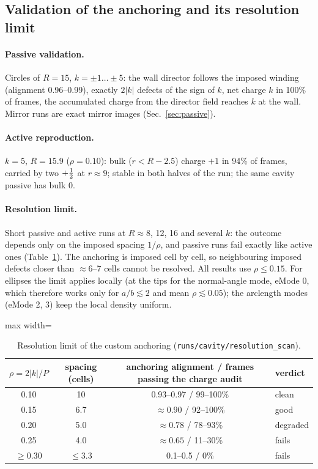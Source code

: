 
\subsection{Validation of the anchoring and its resolution limit}\label{sec:resolution}
\paragraph{Passive validation.} Circles of $R=15$, $k=\pm1\dots\pm5$: the wall director follows the imposed winding
(alignment 0.96--0.99), exactly $2|k|$ defects of the sign of $k$, net charge $k$ in 100\% of frames, the accumulated charge
from the director field reaches $k$ at the wall. Mirror runs are exact mirror images (Sec.~\ref{sec:passive}).
\paragraph{Active reproduction.} $k=5$, $R=15.9$ ($\rho=0.10$): bulk ($r<R-2.5$) charge $+1$ in 94\% of frames, carried by two
$+\tfrac12$ at $r\approx9$; stable in both halves of the run; the same cavity passive has bulk 0.
\paragraph{Resolution limit.} \SIcand Short passive and active runs at $R\approx8$, 12, 16 and several $k$: the outcome depends only on the
imposed spacing $1/\rho$, and passive runs fail exactly like active ones (Table~\ref{tab:res}). The anchoring is imposed
cell by cell, so neighbouring imposed defects closer than $\approx6$--7 cells cannot be resolved. All results use
$\rho\le0.15$. For ellipses the limit applies locally (at the tips for the normal-angle mode, eMode 0, which therefore works
only for $a/b\lesssim2$ and mean $\rho\lesssim0.05$); the arclength modes (eMode 2, 3) keep the local density uniform.
\begin{table}[H]\centering\small
\caption{Resolution limit of the custom anchoring (\texttt{runs/cavity/resolution\_scan}).}\label{tab:res}
\begin{adjustbox}{max width=\textwidth}
\begin{tabular}{cccl}\toprule
$\rho=2|k|/P$ & spacing (cells) & anchoring alignment / frames passing the charge audit & verdict\\\midrule
0.10 & 10  & 0.93--0.97 / 99--100\% & clean\\
0.15 & 6.7 & $\approx0.90$ / 92--100\% & good\\
0.20 & 5.0 & $\approx0.78$ / 78--93\%  & degraded\\
0.25 & 4.0 & $\approx0.65$ / 11--30\% & fails\\
$\ge0.30$ & $\le3.3$ & 0.1--0.5 / 0\% & fails\\\bottomrule
\end{tabular}
\end{adjustbox}
\end{table}
